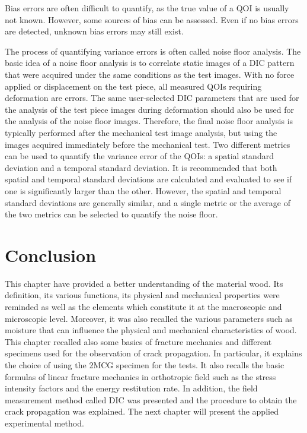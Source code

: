 Bias errors are often difficult to quantify, as the true value of a QOI is usually not known. However, some sources of bias can be assessed. Even if no bias errors are detected, unknown bias errors may still exist.

The process of quantifying variance errors is often called noise floor analysis. The basic idea of a noise floor analysis is to correlate static images of a DIC pattern that were acquired under the same conditions as the test images. With no force applied or displacement on the test piece, all measured QOIs requiring deformation are errors. The same user-selected DIC parameters that are used for the analysis of the test piece images during deformation should also be used for the analysis of the noise floor images. Therefore, the final noise floor analysis is typically performed after the mechanical test image analysis, but using the images acquired immediately before the mechanical test.
Two different metrics can be used to quantify the variance error of the QOIs: a spatial standard deviation and a temporal standard deviation. It is recommended that both spatial and temporal standard deviations are calculated and evaluated to see if one is significantly larger than the other. However, the spatial and temporal standard deviations are generally similar, and a single metric or the average of the two metrics can be selected to quantify the noise floor. 


\section{Conclusion}

This chapter have provided a better understanding of the material wood. Its definition, its various functions, its physical and mechanical properties were reminded as well as the elements which constitute it at the macroscopic and microscopic level. Moreover, it was also recalled the various parameters such as moisture that can influence the physical and mechanical characteristics of wood.
This chapter recalled also some basics of fracture mechanics and different specimens used for the observation of crack propagation. In particular, it explains the choice of using the 2MCG specimen for the tests. It also recalls the basic formulas of linear fracture mechanics in orthotropic field such as the stress intensity factors and the energy restitution rate. In addition, the field measurement method called DIC was presented and the procedure to obtain the crack propagation was explained. The next chapter will present the applied experimental method.


